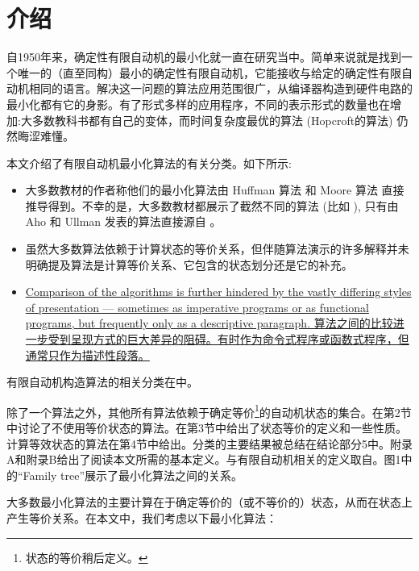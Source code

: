 

\chapter{介绍}

自1950年来，确定性有限自动机的最小化就一直在研究当中。简单来说就是找到一个唯一的（直至同构）最小的确定性有限自动机，它能接收与给定的确定性有限自动机相同的语言。解决这一问题的算法应用范围很广，从编译器构造到硬件电路的最小化都有它的身影。有了形式多样的应用程序，不同的表示形式的数量也在增加:大多数教科书都有自己的变体，而时间复杂度最优的算法 (Hopcroft的算法) 仍然晦涩难懂。

本文介绍了有限自动机最小化算法的有关分类。如下所示:

\begin{itemize}
    \item 大多数教材的作者称他们的最小化算法由 Huffman 算法 \cite{Huff54} 和 Moore 算法 \cite{Moor56} 直接推导得到。不幸的是，大多数教材都展示了截然不同的算法 (比如 \cite{AU92,ASU86,Hu79,Wood87}), 只有由 Aho 和 Ullman 发表的算法直接源自 \cite{Huff54, Moor56}。
    \item 虽然大多数算法依赖于计算状态的等价关系，但伴随算法演示的许多解释并未明确提及算法是计算等价关系、它包含的状态划分还是它的补充。
    \item \uline {Comparison of the algorithms is further hindered by the vastly differing styles of presentation --- sometimes as imperative programs or as functional programs, but frequently only as a descriptive paragraph. 算法之间的比较进一步受到呈现方式的巨大差异的阻碍。有时作为命令式程序或函数式程序，但通常只作为描述性段落。}
\end{itemize}

有限自动机构造算法的相关分类在\cite{Wats93}中。

除了一个算法之外，其他所有算法依赖于确定等价\footnote{状态的等价稍后定义。}的自动机状态的集合。在第2节中讨论了不使用等价状态的算法。在第3节中给出了状态等价的定义和一些性质。计算等效状态的算法在第4节中给出。分类的主要结果被总结在结论部分5中。附录A和附录B给出了阅读本文所需的基本定义。与有限自动机相关的定义取自\cite{Wats93}。图1中的“Family tree”展示了最小化算法之间的关系。

大多数最小化算法的主要计算在于确定等价的（或不等价的）状态，从而在状态上产生等价关系。在本文中，我们考虑以下最小化算法：

